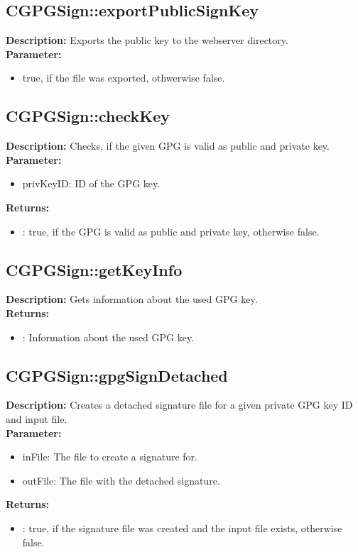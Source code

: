 \subsection{CGPGSign::exportPublicSignKey}
\textbf{Description:} Exports the public key to the webserver directory.\\
\textbf{Parameter:}
\begin{itemize}
\item true, if the file was exported, othwerwise false.
\end{itemize}

\subsection{CGPGSign::checkKey}
\textbf{Description:} Checks, if the given GPG is valid as public and private key.\\
\textbf{Parameter:}
\begin{itemize}
\item privKeyID: ID of the GPG key.
\end{itemize}
\textbf{Returns:}
\begin{itemize}
\item : true, if the GPG is valid as public and private key, otherwise false.
\end{itemize}

\subsection{CGPGSign::getKeyInfo}
\textbf{Description:} Gets information about the used GPG key.\\
\textbf{Returns:}
\begin{itemize}
\item : Information about the used GPG key.
\end{itemize}

\subsection{CGPGSign::gpgSignDetached}
\textbf{Description:} Creates a detached signature file for a given private GPG key ID and input file.\\
\textbf{Parameter:}
\begin{itemize}
\item inFile: The file to create a signature for.
\item outFile: The file with the detached signature.
\end{itemize}
\textbf{Returns:}
\begin{itemize}
\item : true, if the signature file was created and the input file exists, otherwise false.
\end{itemize}

